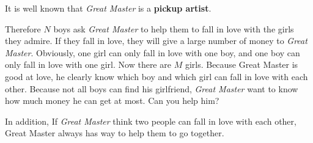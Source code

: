 ﻿It is well known that \textit{Great Master} is a \textbf{pickup artist}.

Therefore $N$ boys ask \textit{Great Master} to help them to fall in love with the girls they admire. If they fall in love, they will give a large number of money to \textit{Great Master}. Obviously, one girl can only fall in love with one boy, and one boy can only fall in love with one girl.
Now there are $M$ girls. Because Great Master is good at love, he clearly know which boy and which girl can fall in love with each other. Because not all boys can find his girlfriend, \textit{Great Master} want to know how much money he can get at most. Can you help him?

In addition, If \textit{Great Master} think two people can fall in love with each other, Great Master always has way to help them to go together.